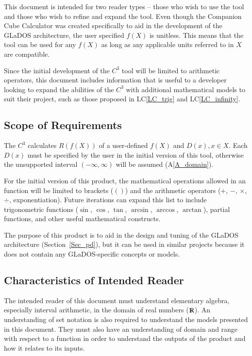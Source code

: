 \documentclass[12pt]{article}
\newcommand{\aref}[1]{A\ref{#1}}
\newcommand{\lcref}[1]{LC\ref{#1}}
\newcommand{\progname}{Companion Cube Calculator} %
\newcommand{\prognameAbbrv}{$C^{3}$}
\begin{document}
This document is intended for two reader types -- those who wish to use the 
tool and those who wish to refine and expand the tool. Even though the 
\progname{} was created specifically to aid in the development of the GLaDOS 
architecture, the user specified $f(X)$ is unitless. This means that the tool 
can be used for any $f(X)$ as long as any applicable units referred to in $X$ 
are compatible.

Since the initial development of the \prognameAbbrv{} tool will be limited to 
arithmetic operators, this document includes information that is useful to a 
developer looking to expand the abilities of the \prognameAbbrv{} with 
additional mathematical models to suit their project, such as those proposed in 
\lcref{LC_trig} and \lcref{LC_infinity}. 

\subsection{Scope of Requirements} 
The \prognameAbbrv{} calculates $R(f(X))$ of a user-defined $f(X)$ and $D(x), x 
\in X$. Each $D(x)$ must be specified by the user in the initial version of 
this tool, otherwise the unsupported interval $(-\infty, \infty)$ will be 
assumed (\aref{A_domain}).  

For the initial version of this product, the mathematical operations allowed in 
an function will be limited to brackets ($()$) and the arithmetic operators 
($+$, $-$, $\times$, $\div$, exponentiation). Future iterations can expand this 
list to include trigonometric functions ($\sin$, $\cos$, $\tan$, $\arcsin$,
$\arccos$, $\arctan$), partial functions, and other useful mathematical 
constructs.

The purpose of this product is to aid in the design and tuning of the GLaDOS 
architecture (Section~\ref{Sec_pd}), but it can be used in similar projects 
because it does not contain any GLaDOS-specific concepts or models.

\subsection{Characteristics of Intended Reader}
\label{intro_reader}
The intended reader of this document must understand elementary algebra, 
especially interval arithmetic, in the domain of real numbers 
($\varmathbb{R}$). An understanding of set notation is also required to 
understand the models presented in this document. They must also have an 
understanding of domain and range with respect to a function in order to 
understand the outputs of the product 
and how it relates to its inputs.
\end{document}
